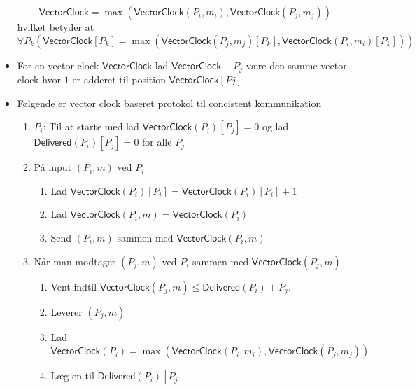 \documentclass[a4, english]{article}
\begin{document}
\begin{itemize}
\begin{equation*}
	\mathsf{VectorClock} = \max(\mathsf{VectorClock}(P_i,m_i), \mathsf{VectorClock}(P_j,m_j))
\end{equation*}
hvilket betyder at 
\begin{equation*}
    \forall P_k (\mathsf{VectorClock}[P_k] = \max(\mathsf{VectorClock}(P_j,m_j)[P_k], \mathsf{VectorClock}(P_i,m_i)[P_k]))
\end{equation*}
  \item For en vector clock $\mathsf{VectorClock}$ lad $\mathsf{VectorClock} + P_j$ være den samme vector clock hvor $1$ er adderet til position $\mathsf{VectorClock}[Pj]$ 
  \item Følgende er vector clock baseret protokol til concistent kommunikation 
  \begin{enumerate}
  	\item $P_i$: Til at starte med lad $\mathsf{VectorClock}(P_i)[P_j] = 0$ og lad $\mathsf{Delivered}(P_i)[P_j]=0$ for alle $P_j$
    \item På input $(P_i,m)$ ved $P_i$
    \begin{enumerate}
    	\item Lad $\mathsf{VectorClock}(P_i)[P_i] = \mathsf{VectorClock}(P_i)[P_i] +1$
      \item Lad $\mathsf{VectorClock}(P_i,m)=\mathsf{VectorClock}(P_i)$ 
      \item Send $(P_i,m)$ sammen med $\mathsf{VectorClock}(P_i,m)$
    \end{enumerate}
    \item Når man modtager $(P_j,m)$ ved $P_i$ sammen med $\mathsf{VectorClock}(P_j,m)$
    \begin{enumerate}
    	\item Vent indtil $\mathsf{VectorClock}(P_j,m) \leq \mathsf{Delivered} (P_i) + P_j$.
      \item Leverer $(P_j,m)$ 
      \item Lad $\mathsf{VectorClock}(P_i) = \max(\mathsf{VectorClock}(P_i,m_i), \mathsf{VectorClock}(P_j,m_j))$
      \item Læg en til $\mathsf{Delivered}(P_i)[P_j]$ 
    \end{enumerate}
  \end{enumerate} 
\end{itemize}
\end{document}
